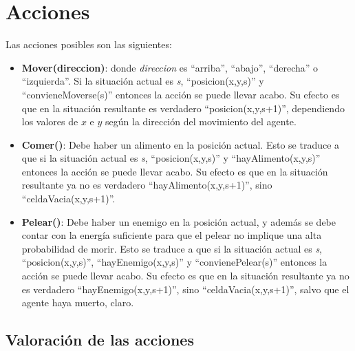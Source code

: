 \section{Acciones}

Las acciones posibles son las siguientes:

\begin{itemize}

\item \textbf{Mover(direccion)}: donde \emph{direccion} es ``arriba'',
``abajo'', ``derecha'' o ``izquierda''. Si la situación actual es \emph{s},
``posicion(x,y,s)'' y ``convieneMoverse(s)'' entonces la acción se puede llevar
acabo. Su efecto es que en la situación resultante es verdadero
``posicion(x,y,s+1)'', dependiendo los valores de $x$ e $y$ según la dirección
del movimiento del agente.

\item \textbf{Comer()}: Debe haber un alimento en la posición actual. Esto se
traduce a que si la situación actual es \emph{s}, ``posicion(x,y,s)'' y
``hayAlimento(x,y,s)'' entonces la acción se puede llevar acabo. Su efecto es
que en la situación resultante ya no es verdadero ``hayAlimento(x,y,s+1)'',
sino ``celdaVacia(x,y,s+1)''.

\item \textbf{Pelear()}: Debe haber un enemigo en la posición actual, y además
se debe contar con la energía suficiente para que el pelear no implique una
alta probabilidad de morir. Esto se traduce a que si la situación actual es
\emph{s}, ``posicion(x,y,s)'', ``hayEnemigo(x,y,s)'' y ``convienePelear(s)''
entonces la acción se puede llevar acabo. Su efecto es que en la situación
resultante ya no es verdadero ``hayEnemigo(x,y,s+1)'', sino
``celdaVacia(x,y,s+1)'', salvo que el agente haya muerto, claro.

\end{itemize}

\subsection{Valoración de las acciones}

